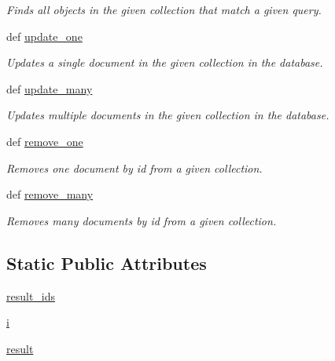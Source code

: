 \begin{DoxyCompactItemize}
\begin{DoxyCompactList}\small\item\em Finds all objects in the given collection that match a given query. \end{DoxyCompactList}\item 
def \hyperlink{classNEAT__PyGenetics_1_1NEAT_1_1Repository_1_1DatabaseConnector_1_1DatabaseConnector_a44ca72a0a552c2c68bb6818e3902548e}{update\+\_\+one}
\begin{DoxyCompactList}\small\item\em Updates a single document in the given collection in the database. \end{DoxyCompactList}\item 
def \hyperlink{classNEAT__PyGenetics_1_1NEAT_1_1Repository_1_1DatabaseConnector_1_1DatabaseConnector_a1181a46de443df2c30f65c5585984eab}{update\+\_\+many}
\begin{DoxyCompactList}\small\item\em Updates multiple documents in the given collection in the database. \end{DoxyCompactList}\item 
def \hyperlink{classNEAT__PyGenetics_1_1NEAT_1_1Repository_1_1DatabaseConnector_1_1DatabaseConnector_a562cd964aa44d7e6051d1436acf047ba}{remove\+\_\+one}
\begin{DoxyCompactList}\small\item\em Removes one document by id from a given collection. \end{DoxyCompactList}\item 
def \hyperlink{classNEAT__PyGenetics_1_1NEAT_1_1Repository_1_1DatabaseConnector_1_1DatabaseConnector_ab576f403333ef9dc793d328bd04c41b6}{remove\+\_\+many}
\begin{DoxyCompactList}\small\item\em Removes many documents by id from a given collection. \end{DoxyCompactList}\end{DoxyCompactItemize}
\subsection*{Static Public Attributes}
\begin{DoxyCompactItemize}
\item 
\hyperlink{classNEAT__PyGenetics_1_1NEAT_1_1Repository_1_1DatabaseConnector_1_1DatabaseConnector_ae6a5bd1fe8b17e6f4daeb34016befacc}{result\+\_\+ids}
\item 
\hyperlink{classNEAT__PyGenetics_1_1NEAT_1_1Repository_1_1DatabaseConnector_1_1DatabaseConnector_aa64c3cdec4a68d8b9cb70eff5fc65da1}{i}
\item 
\hyperlink{classNEAT__PyGenetics_1_1NEAT_1_1Repository_1_1DatabaseConnector_1_1DatabaseConnector_ac4e5c7484ac4c90604a438b88250f4cc}{result}
\end{DoxyCompactItemize}


